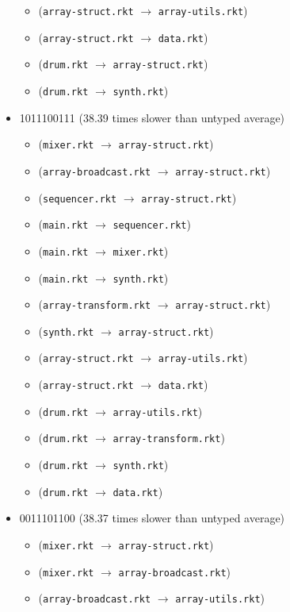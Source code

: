 \documentclass{article}
\newcommand{\mono}[1]{\texttt{#1}}
\begin{document}
\begin{itemize}
\begin{itemize}
  \item (\mono{array-struct.rkt} $\rightarrow$ \mono{array-utils.rkt})
  \item (\mono{array-struct.rkt} $\rightarrow$ \mono{data.rkt})
  \item (\mono{drum.rkt} $\rightarrow$ \mono{array-struct.rkt})
  \item (\mono{drum.rkt} $\rightarrow$ \mono{synth.rkt})
  \end{itemize}
\item 1011100111 (38.39 times slower than untyped average)
  \begin{itemize}
  \item (\mono{mixer.rkt} $\rightarrow$ \mono{array-struct.rkt})
  \item (\mono{array-broadcast.rkt} $\rightarrow$ \mono{array-struct.rkt})
  \item (\mono{sequencer.rkt} $\rightarrow$ \mono{array-struct.rkt})
  \item (\mono{main.rkt} $\rightarrow$ \mono{sequencer.rkt})
  \item (\mono{main.rkt} $\rightarrow$ \mono{mixer.rkt})
  \item (\mono{main.rkt} $\rightarrow$ \mono{synth.rkt})
  \item (\mono{array-transform.rkt} $\rightarrow$ \mono{array-struct.rkt})
  \item (\mono{synth.rkt} $\rightarrow$ \mono{array-struct.rkt})
  \item (\mono{array-struct.rkt} $\rightarrow$ \mono{array-utils.rkt})
  \item (\mono{array-struct.rkt} $\rightarrow$ \mono{data.rkt})
  \item (\mono{drum.rkt} $\rightarrow$ \mono{array-utils.rkt})
  \item (\mono{drum.rkt} $\rightarrow$ \mono{array-transform.rkt})
  \item (\mono{drum.rkt} $\rightarrow$ \mono{synth.rkt})
  \item (\mono{drum.rkt} $\rightarrow$ \mono{data.rkt})
  \end{itemize}
\item 0011101100 (38.37 times slower than untyped average)
  \begin{itemize}
  \item (\mono{mixer.rkt} $\rightarrow$ \mono{array-struct.rkt})
  \item (\mono{mixer.rkt} $\rightarrow$ \mono{array-broadcast.rkt})
  \item (\mono{array-broadcast.rkt} $\rightarrow$ \mono{array-utils.rkt})

\end{itemize}
\end{itemize}
\end{document}
